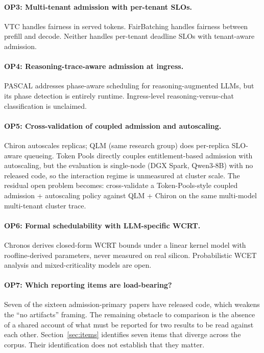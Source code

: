 \documentclass[11pt,letterpaper]{article}
\theoremstyle{definition}
\begin{document}
\paragraph{OP3: Multi-tenant admission with per-tenant SLOs.}
VTC handles fairness in served tokens. FairBatching handles fairness
between prefill and decode. Neither handles per-tenant deadline SLOs
with tenant-aware admission.

\paragraph{OP4: Reasoning-trace-aware admission at ingress.}
PASCAL addresses phase-aware scheduling for reasoning-augmented LLMs,
but its phase detection is entirely runtime. Ingress-level
reasoning-versus-chat classification is unclaimed.

\paragraph{OP5: Cross-validation of coupled admission and autoscaling.}
Chiron autoscales replicas; QLM (same research group) does
per-replica SLO-aware queueing. Token Pools
\cite{cunningham2026tokenpools} directly couples entitlement-based
admission with autoscaling, but the evaluation is single-node
(DGX Spark, Qwen3-8B) with no released code, so the interaction
regime is unmeasured at cluster scale. The residual open problem
becomes: cross-validate a Token-Pools-style coupled admission +
autoscaling policy against QLM + Chiron on the same multi-model
multi-tenant cluster trace.

\paragraph{OP6: Formal schedulability with LLM-specific WCRT.}
Chronos derives closed-form WCRT bounds under a linear kernel model
with roofline-derived parameters, never measured on real silicon.
Probabilistic WCET analysis and mixed-criticality models are open.

\paragraph{OP7: Which reporting items are load-bearing?}
Seven of the sixteen admission-primary papers have released code, which
weakens the ``no artifacts'' framing. The remaining obstacle to
comparison is the absence of a shared account of what must be reported
for two results to be read against each other.
Section~\ref{sec:items} identifies seven items that diverge across the
corpus. Their identification does not establish that they matter.
\end{document}
